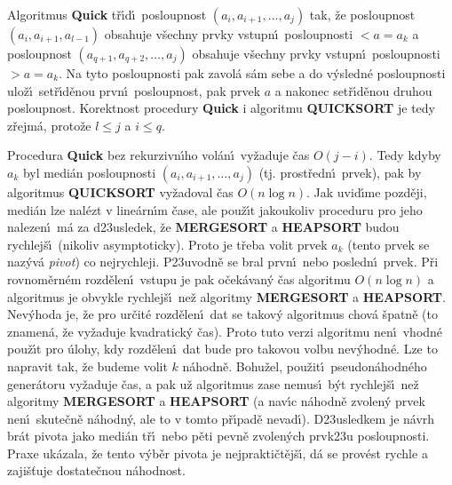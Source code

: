 \flushpar Algoritmus {\bf Quick} t\v r\'\i d\'\i\ posloupnost 
$\left(a_i,a_{i+1},\dots,a_j\right)$ tak, \v ze posloupnost $\left(a_i,a_{i+1}
,a_{l-1}\right)$ obsahuje v\v sechny prvky vstupn\'\i\ posloupnosti $<a=a_k$ a  
posloupnost $\left(a_{q+1},a_{q+2},\dots,a_j\right)$ obsahuje v\v sechny prvky 
vstupn\'\i\ posloupnosti $>a=a_k$. Na tyto posloupnosti pak 
zavol\'a s\'am sebe a do v\'ysledn\'e posloupnosti ulo\v z\'\i\ 
set\v r\'\i d\v enou prvn\'\i\ posloupnost, pak prvek $a$ a nakonec 
set\v r\'\i d\v enou druhou posloupnost. Korektnost procedury 
{\bf Quick}  i algoritmu {\bf QUICKSORT} je tedy z\v rejm\'a, proto\v ze 
$l\le j$ a $i\le q$. 
\medskip

\flushpar Procedura {\bf Quick} bez rekurzivn\'\i ho vol\'an\'\i\ 
vy\v zaduje \v cas $O\left(j-i\right)$. Tedy kdyby $a_k$ byl medi\'an 
posloupnosti $\left(a_i,a_{i+1},\dots,a_j\right)$ (tj. prost\v redn\'\i\ prvek), pak 
by algoritmus {\bf QUICKSORT} vy\-\v zadoval \v cas $O\left(n\log n\right)$. Jak 
uvid\'\i me pozd\v eji, medi\'an lze nal\'ezt v line\'ar\-n\'\i m \v case, ale 
pou\v z\'\i t jakoukoliv proceduru pro jeho nalezen\'\i\ m\'a za 
d\accent23usledek, \v ze {\bf MERGESORT} a {\bf HEAPSORT }
budou rychlej\v s\'\i\ (nikoliv asymptoticky). Proto je t\v reba 
volit prvek $a_k$ (tento prvek se naz\'yv\'a \emph{pivot}) co 
nejrychleji. P\accent23uvodn\v e se bral prvn\'\i\ nebo 
posledn\'\i\ prvek. P\v ri rovnom\v ern\'em rozd\v elen\'\i\ vstupu je 
pak o\v cek\'avan\'y \v cas algoritmu $O\left(n\log n\right)$ a algoritmus je 
obvykle rychlej\v s\'\i\ ne\v z algoritmy {\bf MERGESORT} a 
{\bf HEAPSORT}. Nev\'yhoda je, \v ze pro ur\v cit\'e rozd\v elen\'\i\ dat se 
takov\'y algoritmus chov\'a \v spatn\v e (to znamen\'a, \v ze 
vy\v zaduje kvadra\-tick\'y \v cas). Proto tuto 
verzi algoritmu nen\'\i\ vhodn\'e pou\v z\'\i t pro \'ulohy, kdy 
rozd\v elen\'\i\ dat bude pro takovou volbu nev\'yhodn\'e. 
Lze to napravit tak, \v ze budeme volit $k$ n\'ahodn\v e. Bohu\v zel, 
pou\v zit\'\i\ pseudon\'ahodn\'eho gener\'atoru vy\v zaduje \v cas, a pak 
u\v z algoritmus zase nemus\'\i\ b\'yt rychlej\v s\'\i\ ne\v z algoritmy 
{\bf MERGESORT} a {\bf HEAPSORT} (a nav\'\i c n\'ahodn\v e zvolen\'y 
prvek nen\'\i\ skute\v cn\v e n\'ahodn\'y, ale to v tomto p\v r\'\i pad\v e 
nevad\'\i ). D\accent23usledkem je n\'avrh br\'at pivota jako 
medi\'an t\v r\'\i\ nebo p\v eti pevn\v e zvolen\'ych prvk\accent23u 
posloupnosti. Praxe uk\'azala, \v ze tento v\'yb\v er pivota je 
nej\-prakti\v ct\v ej\v s\'\i , d\'a se prov\'est rychle a zaji\v s\v tuje 
dostate\v cnou n\'a\-hod\-nost.
\medskip

